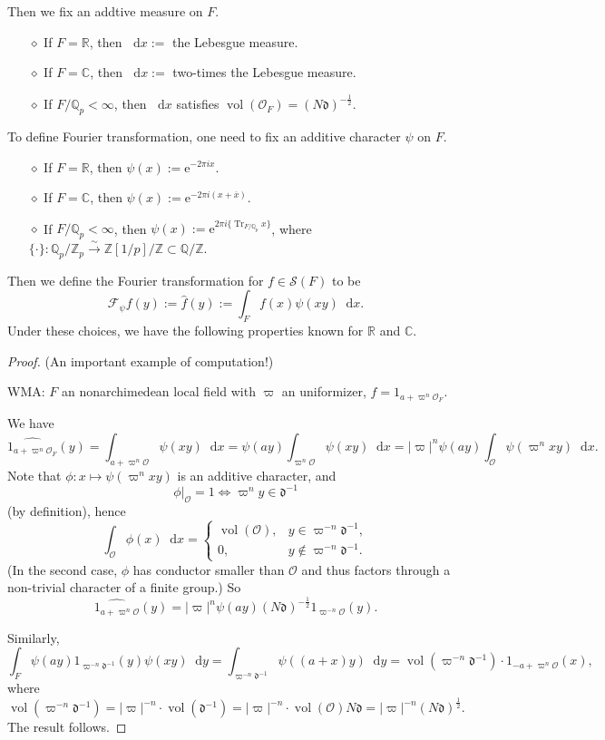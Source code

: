 \documentclass{article}
\newtheorem{theorem}{Theorem}
\theoremstyle{definition}
\theoremstyle{remark}
\renewcommand{\bar}{\overline}
\renewcommand{\hat}{\widehat}
\newcommand{\R}{\mathbb{R}}
\newcommand{\C}{\mathbb{C}}
\newcommand{\Q}{\mathbb{Q}}
\newcommand{\Z}{\mathbb{Z}}
\DeclareMathOperator{\tr}{Tr} %
\newcommand{\isomto}{\stackrel{\sim}{\rightarrow}} %
\newcommand{\dx}{\mathop{}\!\mathrm{d}x}
\newcommand{\dy}{\mathop{}\!\mathrm{d}y}
\newcommand{\diff}{\mathfrak{d}}
\renewcommand{\O}{\mathcal{O}}
\DeclareMathOperator{\vol}{vol}
\newcommand{\e}{\mathrm{e}}
\newcommand{\myit}{$\diamond$}
\begin{document}
Then we fix an addtive measure on $F$.
\begin{enumerate}
    \item [\myit] If $F = \R$, then $\dx := $ the Lebesgue measure.
    \item [\myit] If $F = \C$, then $\dx := $ two-times the Lebesgue measure.
    \item [\myit] If $F/\Q_p<\infty$, then $\dx$ satisfies $\vol(\O_{F}) = (N\diff)^{-\frac{1}{2}}$.
\end{enumerate}

To define Fourier transformation, one need to fix an additive character $\psi$ on $F$. 
\begin{enumerate}
    \item [\myit] If $F = \R$, then $\psi(x) := \e^{-2\pi ix}$.
    \item [\myit] If $F = \C$, then $\psi(x) := \e^{-2\pi i(x + \bar{x}) }$.
    \item [\myit] If $F/\Q_p < \infty$, then $\psi(x) := \e^{2\pi i\{\tr_{F/\Q_p}x\}}$, where $\{\cdot\}: \Q_p/\Z_p\isomto \Z[1/p]/\Z \subset \Q/\Z$.
\end{enumerate}
Then we define the Fourier transformation for $f\in\mathcal{S}(F)$ to be \[\mathcal{F}_\psi f (y) := \hat{f}(y) := \int_{F}f(x)\psi(xy)\dx.\]
Under these choices, we have the following properties known for $\R$ and $\C$.
\begin{proof}
    (An important example of computation!)

    WMA: $F$ an nonarchimedean local field with $\varpi$ an uniformizer, $f = 1_{a+\varpi^n\O_F}$. 

    We have \[\hat{1_{a+\varpi^n\O_F}}(y) = \int_{a+\varpi^n\O} \psi(xy)\dx = \psi(ay)\int_{\varpi^n\O}\psi(xy)\dx = |\varpi|^n\psi(ay)\int_{\O}\psi(\varpi^nxy)\dx.\]
    Note that $\phi: x\mapsto\psi(\varpi^nxy)$ is an additive character, and
    \[\phi|_{\O} = 1 \iff \varpi^ny\in\diff^{-1}\]
    (by definition), hence \[\int_\O \phi(x)\dx = \begin{cases}
        \vol(\O), &y\in \varpi^{-n}\diff^{-1},\\
        0, &y\notin\varpi^{-n}\diff^{-1}.
    \end{cases}\]
    (In the second case, $\phi$ has conductor smaller than $\O$ and thus factors through a non-trivial character of a finite group.)
    So \[\hat{1_{a+\varpi^n\O}}(y) = |\varpi|^n\psi(ay)(N\diff)^{-\frac{1}{2}}1_{\varpi^{-n}\O}(y).\]

    Similarly, \[\int_F\psi(ay)1_{\varpi^{-n}\diff^{-1}}(y)\psi(xy)\dy = \int_{\varpi^{-n}\diff^{-1}} \psi((a+x)y)\dy = \vol(\varpi^{-n}\diff^{-1})\cdot 1_{-a + \varpi^n\O}(x),\]
    where \[\vol(\varpi^{-n}\diff^{-1}) = |\varpi|^{-n}\cdot\vol(\diff^{-1}) = |\varpi|^{-n}\cdot \vol(\O)N\diff = |\varpi|^{-n}(N\diff)^{\frac{1}{2}}.\]
    The result follows.
\end{proof}
\end{document}
